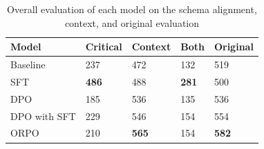\documentclass[11pt]{article}
\begin{document}
\begin{table} [H]
    \centering
    \begin{tabular}{p{1.4cm}lp{1.2cm}ll}
        \hline
        \textbf{Model} & \textbf{Critical} &  \textbf{Context} & \textbf{Both} & \textbf{Original}\\
        \hline
        Baseline & 237 &  472 &  132 &519   \\
        SFT & \textbf{486} &  488 & \textbf{281} & 500 \\
        DPO & 185 &  536 & 135 & 536 \\
        DPO with SFT & 229 & 546 & 154 & 554 \\
        ORPO & 210 & \textbf{565} & 154 & \textbf{582} \\
        \hline
    \end{tabular}
    \caption{Overall evaluation of each model on the schema alignment, context, and original evaluation}
    \label{tab: overall}
\end{table}
\end{document}
